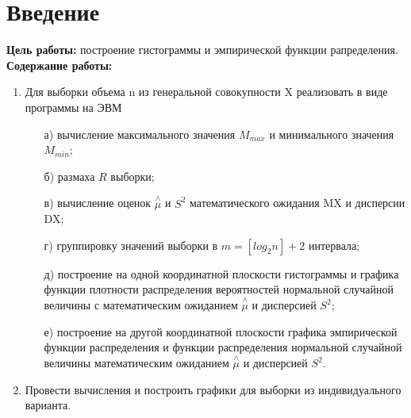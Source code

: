 \chapter*{Введение}
\textbf{Цель работы:} построение гистограммы и эмпирической функции рапределения.
\textbf{Содержание работы: }
\begin{enumerate}
	\item Для выборки объема n из генеральной совокупности X реализовать в виде программы на ЭВМ
	\begin{itemize}
		\item[а)] вычисление максимального значения $M_{max}$ и минимального значения $M_{min}$;
		\item[б)] размаха $R$ выборки;
		\item[в)] вычисление оценок $\stackrel{\wedge}{\mu}$ и $S^2$ математического ожидания MX и дисперсии DX;
		\item[г)] группировку значений выборки в $m=[log_2 n]+2$ интервала;
		\item[д)] построение на одной координатной плоскости гистограммы и графика функции плотности распределения вероятностей нормальной случайной величины с математическим ожиданием $\stackrel{\wedge}{\mu}$ и дисперсией $S^2$;
		\item[е)] построение на другой координатной плоскости графика эмпирической функции распределения и функции распределения нормальной случайной величины математическим ожиданием $\stackrel{\wedge}{\mu}$ и дисперсией $S^2$.
	\end{itemize}
	\item Провести вычисления и построить графики для выборки из индивидуального варианта.
\end{enumerate}